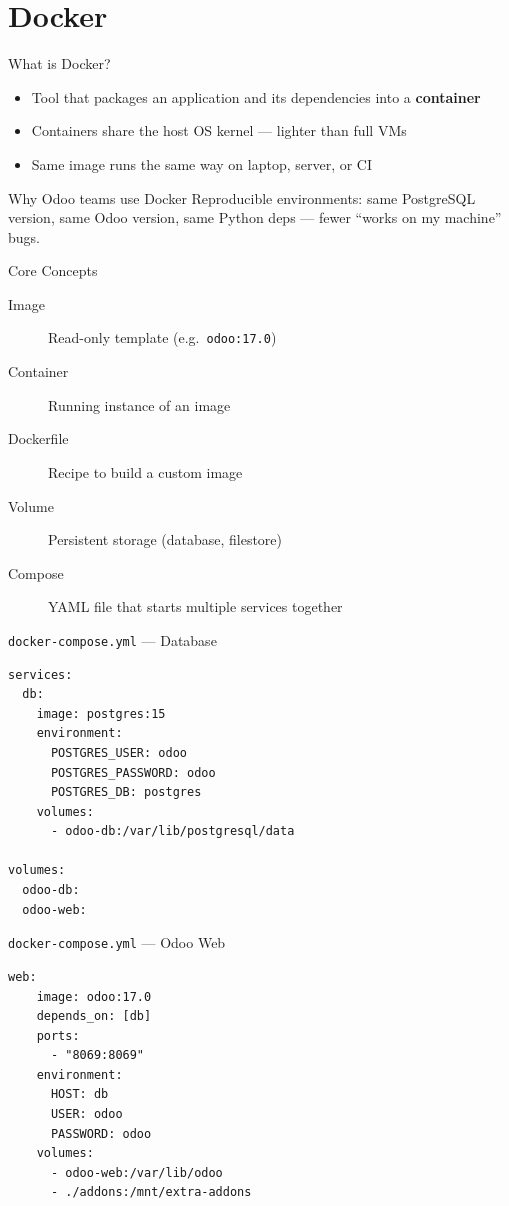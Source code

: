 \section{Docker}

\begin{frame}{What is Docker?}
\begin{itemize}
  \item Tool that packages an application and its dependencies into a \textbf{container}
  \item Containers share the host OS kernel --- lighter than full VMs
  \item Same image runs the same way on laptop, server, or CI
\end{itemize}

\vspace{0.5em}
\begin{block}{Why Odoo teams use Docker}
  Reproducible environments: same PostgreSQL version, same Odoo version, same Python deps --- fewer ``works on my machine'' bugs.
\end{block}
\end{frame}

\begin{frame}{Core Concepts}
\begin{description}
  \item[Image] Read-only template (e.g.\ \texttt{odoo:17.0})
  \item[Container] Running instance of an image
  \item[Dockerfile] Recipe to build a custom image
  \item[Volume] Persistent storage (database, filestore)
  \item[Compose] YAML file that starts multiple services together
\end{description}
\end{frame}

\begin{frame}[fragile]{\texttt{docker-compose.yml} --- Database}
\begin{lstlisting}[language={}]
services:
  db:
    image: postgres:15
    environment:
      POSTGRES_USER: odoo
      POSTGRES_PASSWORD: odoo
      POSTGRES_DB: postgres
    volumes:
      - odoo-db:/var/lib/postgresql/data

volumes:
  odoo-db:
  odoo-web:
\end{lstlisting}
\end{frame}

\begin{frame}[fragile]{\texttt{docker-compose.yml} --- Odoo Web}
\begin{lstlisting}[language={}]
  web:
    image: odoo:17.0
    depends_on: [db]
    ports:
      - "8069:8069"
    environment:
      HOST: db
      USER: odoo
      PASSWORD: odoo
    volumes:
      - odoo-web:/var/lib/odoo
      - ./addons:/mnt/extra-addons
\end{lstlisting}
\end{frame}

